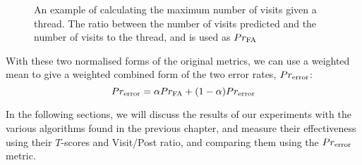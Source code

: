 \begin{figure}
\begin{center}
	
\end{center}
\caption{An example of calculating the maximum number of visits given a thread. 
The ratio between the number of visits predicted and the number of visits to the 
thread, and is used as $\P_{\text{FA}}$}
\label{fig:norm_fa_score}
\end{figure}


With these two normalised forms of the original metrics, we can use a weighted 
mean to give a weighted combined form of the two error rates, 
$\P_{\text{error}}$:
\[
	\P_{\text{error}} = \alpha\P_{\text{FA}} + (1-\alpha)\P_{\text{error}}
\]


In the following sections, we will discuss the results of our experiments with 
the various algorithms found in the previous chapter, and measure their 
effectiveness using their $T$-scores and Visit/Post ratio, and comparing them 
using the  $\P_{\text{error}}$ metric.

